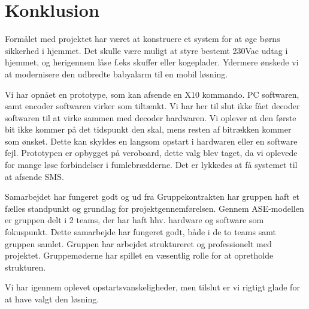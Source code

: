 \chapter{Konklusion}

Formålet med projektet har været at konstruere et system for at øge børns sikkerhed i hjemmet. Det skulle være muligt at styre bestemt 230Vac udtag i hjemmet, og herigennem låse f.eks skuffer eller kogeplader. Ydermere ønskede vi at modernisere den udbredte babyalarm til en mobil løsning. 

Vi har opnået en prototype, som kan afsende en X10 kommando. PC softwaren, samt encoder softwaren virker som tiltænkt. Vi har her til slut ikke fået decoder softwaren til at virke sammen med decoder hardwaren. Vi oplever at den første bit ikke kommer på det tidspunkt den skal, mens resten af bitrækken kommer som ønsket. Dette kan skyldes en langsom opstart i hardwaren eller en software fejl. Prototypen er opbygget på veroboard, dette valg blev taget, da vi oplevede for mange løse forbindelser i fumlebrædderne. 
Det er lykkedes at få systemet til at afsende SMS.  

Samarbejdet har fungeret godt og ud fra Gruppekontrakten har gruppen haft et fælles standpunkt og grundlag for projektgennemførelsen. Gennem ASE-modellen er gruppen delt i 2 teams, der har haft hhv. hardware og software som fokuspunkt. Dette samarbejde har fungeret godt, både i de to teams samt gruppen samlet. Gruppen har arbejdet struktureret og professionelt med projektet. Gruppemøderne har spillet en væsentlig rolle for at opretholde strukturen.  

Vi har igennem \LaTex oplevet opstartsvanskeligheder, men tilslut er vi rigtigt glade for at have valgt den løsning. 